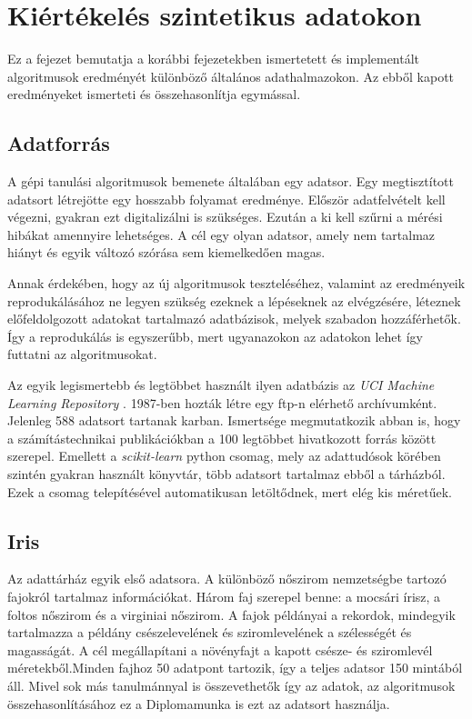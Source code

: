 \chapter{Kiértékelés szintetikus adatokon}\label{chapter:kiertekelesszintetikus}

Ez a fejezet bemutatja a korábbi fejezetekben ismertetett és implementált algoritmusok eredményét különböző általános adathalmazokon. Az ebből kapott eredményeket ismerteti és összehasonlítja egymással.

\section{Adatforrás}
A gépi tanulási algoritmusok bemenete általában egy adatsor. Egy megtisztított adatsort létrejötte egy hosszabb folyamat eredménye. Először adatfelvételt kell végezni, gyakran ezt digitalizálni is szükséges. Ezután a ki kell szűrni a mérési hibákat amennyire lehetséges. A cél egy olyan adatsor, amely nem tartalmaz hiányt és egyik változó szórása sem kiemelkedően magas.

Annak érdekében, hogy az új algoritmusok teszteléséhez, valamint az eredményeik reprodukálásához ne legyen szükség ezeknek a lépéseknek az elvégzésére, léteznek előfeldolgozott adatokat tartalmazó adatbázisok, melyek szabadon hozzáférhetők. Így a reprodukálás is egyszerűbb, mert ugyanazokon az adatokon lehet így futtatni az algoritmusokat.

Az egyik legismertebb és legtöbbet használt ilyen adatbázis az \emph{UCI Machine Learning Repository} \cite{dua2019university}. 1987-ben hozták létre egy ftp-n elérhető archívumként. Jelenleg 588 adatsort tartanak karban. Ismertsége megmutatkozik abban is, hogy a számítástechnikai publikációkban a 100 legtöbbet hivatkozott forrás között szerepel. Emellett a \emph{scikit-learn} python csomag, mely az adattudósok körében szintén gyakran használt könyvtár, több adatsort tartalmaz ebből a tárházból. Ezek a csomag telepítésével automatikusan letöltődnek, mert elég kis méretűek.

\section{Iris}
Az adattárház egyik első adatsora. A különböző nőszirom nemzetségbe tartozó fajokról tartalmaz információkat. Három faj szerepel benne: a mocsári írisz, a foltos nőszirom és a virginiai nőszirom. A fajok példányai a rekordok, mindegyik tartalmazza a példány csészelevelének és sziromlevelének a szélességét és magasságát. A cél megállapítani a növényfajt a kapott csésze- és sziromlevél méretekből.Minden fajhoz 50 adatpont tartozik, így a teljes adatsor 150 mintából áll. Mivel sok más tanulmánnyal is összevethetők így az adatok, az algoritmusok összehasonlításához ez a Diplomamunka is ezt az adatsort használja.

